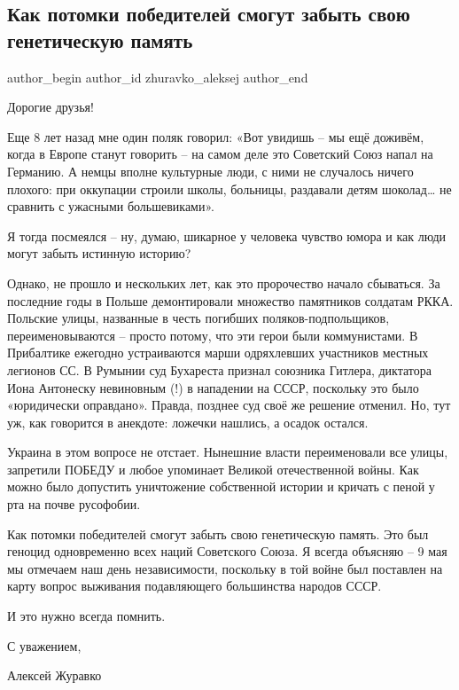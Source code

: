  
 
 
 
 
 
\subsection{Как потомки победителей смогут забыть свою генетическую память}
\label{sec:10_12_2021.fb.zhuravko_aleksej.1.potomki_pobeditelej}
 
\ifcmt
 author_begin
   author_id zhuravko_aleksej
 author_end
\fi

Дорогие друзья! 

Еще 8 лет назад мне один поляк говорил: «Вот увидишь – мы ещё доживём, когда в
Европе станут говорить – на самом деле это Советский Союз напал на Германию. А
немцы вполне культурные люди, с ними не случалось ничего плохого: при оккупации
строили школы, больницы, раздавали детям шоколад… не сравнить с ужасными
большевиками».

Я тогда посмеялся – ну, думаю, шикарное у человека чувство юмора и как люди
могут забыть истинную историю? 


Однако, не прошло и нескольких лет, как это пророчество начало сбываться. За
последние годы в Польше демонтировали множество памятников солдатам РККА.
Польские улицы, названные в честь погибших поляков-подпольщиков,
переименовываются – просто потому, что эти герои были коммунистами. В
Прибалтике ежегодно устраиваются марши одряхлевших участников местных легионов
СС. В Румынии суд Бухареста признал союзника Гитлера, диктатора Иона Антонеску
невиновным (!) в нападении на СССР, поскольку это было «юридически оправдано».
Правда, позднее суд своё же решение отменил. Но, тут уж, как говорится в
анекдоте: ложечки нашлись, а осадок остался. 

Украина в этом вопросе не отстает. Нынешние власти переименовали все улицы,
запретили ПОБЕДУ и любое упоминает Великой отечественной войны. Как можно было
допустить уничтожение собственной истории и кричать с пеной у рта на почве
русофобии. 

Как потомки победителей смогут забыть свою генетическую память. Это был геноцид
одновременно всех наций Советского Союза. Я всегда объясняю – 9 мая мы отмечаем
наш день независимости, поскольку в той войне был поставлен на карту вопрос
выживания подавляющего большинства народов СССР. 

И это нужно всегда помнить.

С уважением, 

Алексей Журавко
